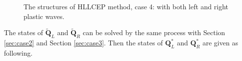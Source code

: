 \documentclass{article}
\numberwithin{equation}{section}
\numberwithin{table}{section}
\begin{document}
\begin{figure}
  \centering
\begin{tikzpicture}
\end{tikzpicture}
\caption{The  structures of HLLCEP method, case 4: with both left and right plastic waves.}
\label{fig:case4}
\end{figure}

The states of $\widetilde{\bm{Q}}_L$ and   $\widetilde{\bm{Q}}_R$ can be solved by the same process with Section \ref{sec:case2} and Section \ref{sec:case3}. Then the states of $\bm{Q}^*_L$ and $\bm{Q}^*_R$ are given as following.
\end{document}
